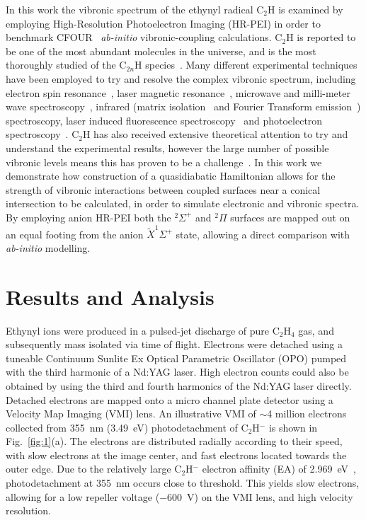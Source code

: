 \documentclass[journal=jpcafh,manuscript=article,layout=onecolumn, 12pt]{achemso}
\begin{document}
In this work the vibronic spectrum of the ethynyl radical C$_2$H is examined by employing High-Resolution Photoelectron Imaging (HR-PEI) in order to benchmark CFOUR~\cite{dev20}  \emph{ab-initio} vibronic-coupling calculations. C$_2$H is reported to be one of the most abundant molecules in the universe, and is the most thoroughly studied of the C$_{2n}$H species~\cite{wil91,hei99,for10}. Many different experimental techniques have been employed to try and resolve the complex vibronic spectrum, including electron spin resonance~\cite{coc64,jin85}, laser magnetic resonance~\cite{bro88,pfe96,sch98}, microwave and milli-meter wave spectroscopy~\cite{sas81,got83,end89,mul00}, infrared (matrix isolation~\cite{she87,jac87,for95} and Fourier Transform emission~\cite{ver88}) spectroscopy, laser induced fluorescence spectroscopy~\cite{hsu93,hsu95,chi99} and photoelectron spectroscopy~\cite{erv91,tay98,zho07}. C$_2$H has also received extensive theoretical attention to try and understand the experimental results, however the large number of possible vibronic levels means this has proven to be a challenge~\cite{per90,per91,per91b,per91c,per92,car00,tar03,tar04,for10,sta21,gul21}. In this work we demonstrate how construction of a quasidiabatic Hamiltonian allows for the strength of vibronic interactions between coupled surfaces near a conical intersection to be calculated, in order to simulate electronic and vibronic spectra. By employing anion HR-PEI both the $^2\Sigma^+$ and $^2\Pi$ surfaces are mapped out on an equal footing from the anion $\tilde{X}^1\Sigma^+$ state, allowing a direct comparison with \emph{ab-initio} modelling.

\section{Results and Analysis}
Ethynyl ions were produced in a pulsed-jet discharge of pure C$_2$H$_4$ gas, and subsequently mass isolated via time of flight. Electrons were detached using a tuneable Continuum Sunlite Ex Optical Parametric Oscillator (OPO) pumped with the third harmonic of a Nd:YAG laser. High electron counts could also be obtained by using the third and fourth harmonics of the Nd:YAG laser directly. Detached electrons are mapped onto a micro channel plate detector using a Velocity Map Imaging (VMI) lens. An illustrative VMI of $\sim$4 million electrons collected from 355~nm (3.49~eV) photodetachment of C$_2$H$^-$ is shown in Fig.~\ref{fig:1}(a). The electrons are distributed radially according to their speed, with slow electrons at the image center, and fast electrons located towards the outer edge. Due to the relatively large C$_2$H$^-$ electron affinity (EA) of 2.969~eV~\cite{erv91}, photodetachment at 355~nm occurs close to threshold. This yields slow electrons, allowing for a low repeller voltage ($-600$~V) on the VMI lens, and high velocity resolution. 
\end{document}

